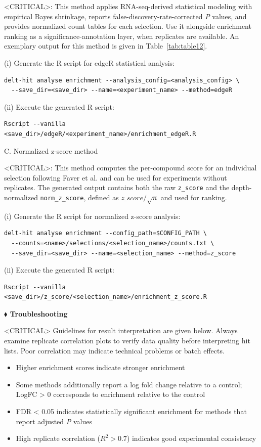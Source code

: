 <CRITICAL>: This method applies RNA-seq-derived statistical modeling with empirical Bayes shrinkage, reports false-discovery-rate-corrected \textit{P} values, and provides normalized count tables for each selection. Use it alongside enrichment ranking as a significance-annotation layer, when replicates are available. An exemplary output for this method is given in Table~\ref{tab:table12}.

(i) Generate the R script for edgeR statistical analysis:
\begin{lstlisting}
delt-hit analyse enrichment --analysis_config=<analysis_config> \
  --save_dir=<save_dir> --name=<experiment_name> --method=edgeR
\end{lstlisting}

(ii) Execute the generated R script:
\begin{lstlisting}
Rscript --vanilla <save_dir>/edgeR/<experiment_name>/enrichment_edgeR.R
\end{lstlisting}


C. Normalized z-score method

<CRITICAL>: This method computes the per-compound score for an individual selection following Faver et al.\cite{faver_quantitativecomparisonenrichment_2019} and can be used for experiments without replicates. The generated output contains both the raw \texttt{z\_score} and the depth-normalized \texttt{norm\_z\_score}, defined as $z\_score / \sqrt{n}$ and used for ranking. 

(i) Generate the R script for normalized z-score analysis:
\begin{lstlisting}
delt-hit analyse enrichment --config_path=$CONFIG_PATH \
  --counts=<name>/selections/<selection_name>/counts.txt \
  --save_dir=<save_dir> --name=<selection_name> --method=z_score
\end{lstlisting}

(ii) Execute the generated R script:
\begin{lstlisting}
Rscript --vanilla <save_dir>/z_score/<selection_name>/enrichment_z_score.R
\end{lstlisting}


\textbf{$\blacklozenge$ Troubleshooting}


<CRITICAL> Guidelines for result interpretation are given below. Always examine replicate correlation plots to verify data quality before interpreting hit lists. Poor correlation may indicate technical problems or batch effects. 

\begin{itemize}
  \item Higher enrichment scores indicate stronger enrichment
  \item Some methods additionally report a log fold change relative to a control; LogFC \textgreater{} 0 corresponds to enrichment relative to the control
  \item FDR \textless{} 0.05 indicates statistically significant enrichment for methods that report adjusted \textit{P} values
  \item High replicate correlation ($R^2 > 0.7$) indicates good experimental consistency
\end{itemize}


